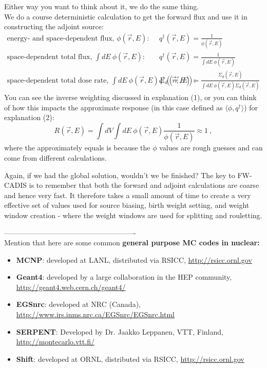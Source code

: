 \documentclass[12pt]{article}
\begin{document}
\vspace*{1 em}
Either way you want to think about it, we do the same thing. \\
We do a course deterministic calculation to get the forward flux and use it in constructing the adjoint source:
\begin{align*}
\text{energy- and space-dependent flux, } \phi(\vec{r},E): \quad & q^{\dagger}(\vec{r},E) = \frac{1}{\phi(\vec{r},E)}\\
\text{space-dependent total flux, } \int dE\:\phi(\vec{r},E): \quad & q^{\dagger}(\vec{r},E) = \frac{1}{\int dE\:\phi(\vec{r},E)}\\
\text{space-dependent total dose rate, } \int dE\:\phi(\vec{r},E) \Sigma_d(\vec{r},E): \quad & q^{\dagger}(\vec{r},E) = \frac{\Sigma_d(\vec{r},E)}{\int dE\:\phi(\vec{r},E)\Sigma_d(\vec{r},E)}
\end{align*} 
You can see the inverse weighting discussed in explanation (1), or you can think of how this impacts the approximate response (in this case defined as $\langle \phi, q^{\dagger}\rangle$) for explanation (2):
\[
R(\vec{r},E) = \int dV \int dE \: \phi(\vec{r},E) \frac{1}{\phi(\vec{r},E)} \approx 1\:,
\]
where the approximately equals is because the $\phi$ values are rough guesses and can come from different calculations.

Again, if we had the global solution, wouldn't we be finished? The key to FW-CADIS is to remember that both the forward and adjoint calculations are coarse and hence very fast. It therefore takes a small amount of time to create a very effective set of values used for source biasing, birth weight setting, and weight window creation - where the weight windows are used for splitting and rouletting. 

-------------------------------------------------------\\
Mention that here are some common \textbf{general purpose MC codes in nuclear:}
\begin{itemize}
\item \textbf{MCNP}: developed at LANL, distributed via RSICC, \href{http://rsicc.ornl.gov}{http://rsicc.ornl.gov}
\item \textbf{Geant4}: developed by a large collaboration in the HEP community, \href{ http://geant4.web.cern.ch/geant4/}{http://geant4.web.cern.ch/geant4/}
\item \textbf{EGSnrc}: developed at NRC (Canada), \href{http://www.irs.inms.nrc.ca/EGSnrc/EGSnrc.html}{http://www.irs.inms.nrc.ca/EGSnrc/EGSnrc.html}
\item \textbf{SERPENT}: Developed by Dr. Jaakko Leppanen, VTT, Finland, \href{ http://montecarlo.vtt.fi/}{http://montecarlo.vtt.fi/}
\item \textbf{Shift}: developed at ORNL, distributed via RSICC, \href{http://rsicc.ornl.gov}{http://rsicc.ornl.gov}
\end{itemize}
\end{document}
